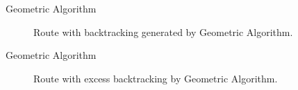 \documentclass{beamer}
\begin{document}
\begin{frame}{Geometric Algorithm \cite{lu2015arc}}
\begin{figure}
\caption{Route with backtracking generated by Geometric Algorithm.}
\end{figure}    
\end{frame}

\begin{frame}{Geometric Algorithm \cite{lu2015arc}}
\begin{figure}
\caption{Route with excess backtracking by Geometric Algorithm.}
\end{figure}    
\end{frame}
\end{document}
